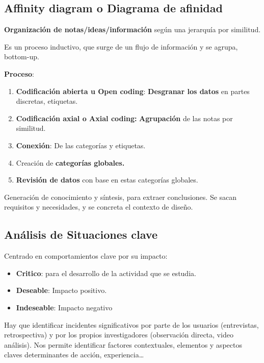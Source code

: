 \documentclass[12pt, twoside, openright]{report} %
\begin{document}
\subsection{Affinity diagram o Diagrama de
	afinidad}

\textbf{Organización de notas/ideas/información} según una jerarquía por
similitud.

Es un proceso inductivo, que surge de un flujo de información y se
agrupa, bottom-up.

\textbf{Proceso}:

\begin{enumerate}
	\item \textbf{Codificación abierta u Open coding}: \textbf{Desgranar los
		      datos} en partes discretas, etiquetas.
	\item \textbf{Codificación axial o Axial coding:} \textbf{Agrupación} de las
	      notas por similitud.
	\item \textbf{Conexión}: De las categorías y etiquetas.
	\item Creación de \textbf{categorías globales.}
	\item \textbf{Revisión de datos} con base en estas categorías globales.
\end{enumerate}

Generación de conocimiento y síntesis, para extraer conclusiones.
Se sacan requisitos y necesidades, y se concreta el contexto de diseño.

\subsection{Análisis de Situaciones
	clave}

Centrado en comportamientos clave por su impacto:

\begin{itemize}
	\item \textbf{Critico}: para el desarrollo de la actividad que se estudia.
	\item \textbf{Deseable}: Impacto positivo.
	\item \textbf{Indeseable}: Impacto negativo
\end{itemize}

Hay que identificar incidentes significativos por parte de los usuarios
(entrevistas, retrospectiva) y por los propios investigadores
(observación directa, video análisis). Nos permite identificar factores
contextuales, elementos y aspectos claves determinantes de acción,
experiencia\ldots{}
\end{document}
